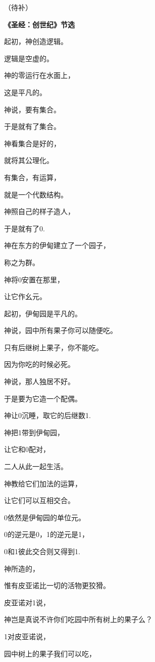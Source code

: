 （待补）

\newpage

\begin{centering}
\begin{Large}
\textbf{《圣经：创世纪》节选}
\end{Large}\vsp
\large

起初，神创造逻辑。

逻辑是空虚的。

神的零运行在水面上，

这是平凡的。

神说，要有集合。

于是就有了集合。

神看集合是好的，

就将其公理化。

有集合，有运算，

就是一个代数结构。\vsp

神照自己的样子造人，

于是就有了0.

神在东方的伊甸建立了一个园子，

称之为群。

神将0安置在那里，

让它作幺元。

起初，伊甸园是平凡的。

神说，园中所有果子你可以随便吃。

只有后继树上果子，你不能吃。

因为你吃的时候必死。\vsp

神说，那人独居不好。

于是要为它造一个配偶。

神让0沉睡，取它的后继数1.

神把1带到伊甸园，

让它和0配对，

二人从此一起生活。

神教给它们加法的运算，

让它们可以互相交合。

0依然是伊甸园的单位元。

0的逆元是0，1的逆元是1，

0和1彼此交合则又得到1.\vsp

神所造的，

惟有皮亚诺比一切的活物更狡猾。

皮亚诺对1说，

神岂是真说不许你们吃园中所有树上的果子么？

1对皮亚诺说，

园中树上的果子我们可以吃，


\end{centering}
